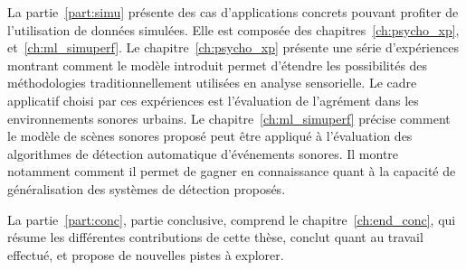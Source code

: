 La partie~\ref{part:simu} présente des cas d'applications concrets pouvant profiter de l'utilisation de données simulées. Elle est composée des chapitres~\ref{ch:psycho_xp}, et~\ref{ch:ml_simuperf}. Le chapitre~\ref{ch:psycho_xp} présente une série d'expériences montrant comment le modèle introduit permet d'étendre les possibilités des méthodologies traditionnellement utilisées en analyse sensorielle. Le cadre applicatif choisi par ces expériences est l'évaluation de l'agrément dans les environnements sonores urbains. Le chapitre~\ref{ch:ml_simuperf} précise comment le modèle de scènes sonores proposé peut être appliqué à l'évaluation des algorithmes de détection automatique d'événements sonores. Il montre notamment comment il permet de gagner en connaissance quant à la capacité de généralisation des systèmes de détection proposés.

La partie~\ref{part:conc}, partie conclusive, comprend le chapitre~\ref{ch:end_conc}, qui résume les différentes contributions de cette thèse, conclut quant au travail effectué, et propose de nouvelles pistes à explorer. 






